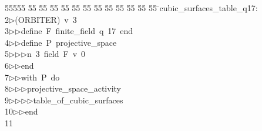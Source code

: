 %
%
\begin{tabbing}
55555 \= 55 \= 55 \= 55 \= 55 \= 55 \= 55 \= 55 \= 55 \= 55 \= 55 \= 55 \= 55 \= \>cubic\_surfaces\_table\_q17:\ \\[0pt]
2\>$\triangleright$\>(ORBITER)\ v\ 3\ \\[0pt]
3\>$\triangleright$\>$\triangleright$\>define\ F\ finite\_field\ q\ 17\ end\ \\[0pt]
4\>$\triangleright$\>$\triangleright$\>define\ P\ projective\_space\ \\[0pt]
5\>$\triangleright$\>$\triangleright$\>$\triangleright$\>n\ 3\ field\ F\ v\ 0\ \\[0pt]
6\>$\triangleright$\>$\triangleright$\>end\ \\[0pt]
7\>$\triangleright$\>$\triangleright$\>with\ P\ do\ \\[0pt]
8\>$\triangleright$\>$\triangleright$\>$\triangleright$\>projective\_space\_activity\ \\[0pt]
9\>$\triangleright$\>$\triangleright$\>$\triangleright$\>$\triangleright$\>table\_of\_cubic\_surfaces\ \\[0pt]
10\>$\triangleright$\>$\triangleright$\>end\\[0pt]
11\>\end{tabbing}
